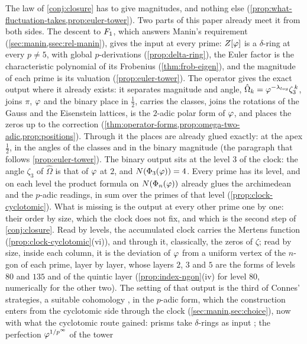 The law of \cref{conj:closure} has to give
    magnitudes, and nothing else (\cref{prop:what-fluctuation-takes,prop:euler-tower}).  Two parts of this paper
    already meet it from both sides.  The descent to $F_1$, which answers Manin's requirement
    (\cref{sec:manin,ssec:rel-manin}), gives the input at every prime: $Z[\varphi]$ is a $\delta$-ring at every
    $p\neq5$, with global $p$-derivations (\cref{prop:delta-ring}), the Euler factor is the characteristic
    polynomial of its Frobenius (\cref{thm:frob-eigen}), and the magnitude of each prime is its
    valuation (\cref{prop:euler-tower}).  The operator gives the exact output where it already exists: it
    separates magnitude and angle, $\hat\Omega_k=\varphi^{-\lambda_{log}}\zeta_3^{\,k}$, joins $\pi$, $\varphi$ and the binary place
    in $\tfrac12$, carries the classes, joins the rotations of the Gauss and the Eisenstein lattices,
    is the $2$-adic polar form of $\varphi$, and places the zeros up to the correction
    (\cref{thm:operator-forms,prop:omega-two-adic,prop:positions}).  Through it the places are already glued exactly: at the apex $\tfrac12$, in the angles of the classes and in the binary magnitude (the paragraph that follows \cref{prop:euler-tower}).  The binary output sits at the level $3$ of the clock:
the angle $\zeta_3$ of $\hat\Omega$ is that of $\varphi$
at $2$, and $N(\Phi_3(\varphi))=4$.  Every prime has its
level, and on each level the product formula on
$N(\Phi_n(\varphi))$ already glues the archimedean and
the $p$-adic readings, in sum over the primes of that
level (\cref{prop:clock-cyclotomic}).  What is missing is
the output at every other prime one by one: their order
by size, which the clock does not fix, and which is the
second step of \cref{conj:closure}.  Read by levels, the
accumulated clock carries the Mertens function
(\cref{prop:clock-cyclotomic}(vi)), and through it,
classically, the zeros of $\zeta$; read by size, inside
each column, it is the deviation of $\varphi$ from a
uniform vertex of the $n$-gon of each prime, layer by
layer, whose layers $2$, $3$ and $5$ are the forms of
levels $80$ and $135$ and of the quintic layer
(\cref{prop:index-ngon}(iv) for level $80$, numerically
for the other two).  The setting of that
output is the third of Connes'
    strategies, a suitable cohomology \cite{connes15essay}, in the $p$-adic form, which the construction enters
from the cyclotomic side through the clock
(\cref{sec:manin,sec:choice}), now with what the
cyclotomic route gained: prisms take $\delta$-rings as input \cite{bhattscholze22}; the perfection $\varphi^{1/p^\infty}$ of the tower
